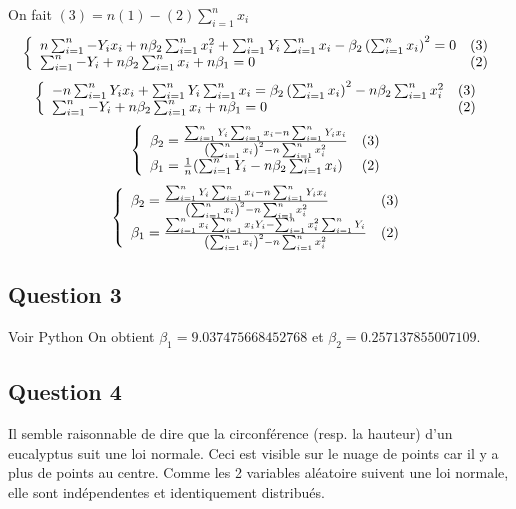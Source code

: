 \documentclass[]{book}
\theoremstyle{definition}
\begin{document}
On fait $(3) = n(1)-(2)\sum_{i=1}^{n}{x_i}$
$$
\left\{
\begin{array}{l l}
n\sum_{i=1}^{n}{-Y_ix_i}+n\beta_2\sum_{i=1}^{n}{x_i^2}+\sum_{i=1}^{n}{Y_i}\sum_{i=1}^{n}{x_i} -\beta_2\left(\sum_{i=1}^{n}{x_i}\right)^2 = 0 & (3)\\
\sum_{i=1}^{n}{-Y_i} +n\beta_2\sum_{i=1}^{n}{x_i}+n\beta_1 = 0 & (2)
\end{array}
\right.
$$
$$
\left\{
\begin{array}{l l}
-n\sum_{i=1}^{n}{Y_ix_i} + \sum_{i=1}^{n}{Y_i}\sum_{i=1}^{n}{x_i} = \beta_2\left(\sum_{i=1}^{n}{x_i}\right)^2 -n\beta_2\sum_{i=1}^{n}{x_i^2}  & (3)\\
\sum_{i=1}^{n}{-Y_i} +n\beta_2\sum_{i=1}^{n}{x_i}+n\beta_1 = 0 & (2)
\end{array}
\right.
$$
$$
\left\{
\begin{array}{l l}
\beta_2 = \frac{\sum_{i=1}^{n}{Y_i}\sum_{i=1}^{n}{x_i}-n\sum_{i=1}^{n}{Y_ix_i}}{\left(\sum_{i=1}^{n}{x_i}\right)^2 -n\sum_{i=1}^{n}{x_i^2}}  & (3)\\
\beta_1 = \frac{1}{n}(\sum_{i=1}^{n}{Y_i} - n\beta_2\sum_{i=1}^{n}{x_i}) & (2)
\end{array}
\right.
$$
$$
\left\{
\begin{array}{l l}
\beta_2 = \frac{\sum_{i=1}^{n}{Y_i}\sum_{i=1}^{n}{x_i}-n\sum_{i=1}^{n}{Y_ix_i}}{\left(\sum_{i=1}^{n}{x_i}\right)^2 -n\sum_{i=1}^{n}{x_i^2}}  & (3)\\
\beta_1 = \frac{\sum_{i=1}^{n}{x_i}\sum_{i=1}^{n}{x_iY_i}-\sum_{i=1}^{n}{x_i^2}\sum_{i=1}^{n}{Y_i}}{\left(\sum_{i=1}^{n}{x_i}\right)^2 -n\sum_{i=1}^{n}{x_i^2}} & (2)
\end{array}
\right.
$$

\subsection*{Question 3}
Voir Python
On obtient $\beta_1 =  9.037475668452768$  et $\beta_2 = 0.257137855007109$.


\subsection*{Question 4}
Il semble raisonnable de dire que la circonf\'erence (resp. la hauteur) d'un eucalyptus suit une loi normale. Ceci est visible sur le nuage de points car il y a plus de points au centre. Comme les 2 variables al\'eatoire suivent une loi normale, elle sont ind\'ependentes et identiquement distribu\'es.
\end{document}
